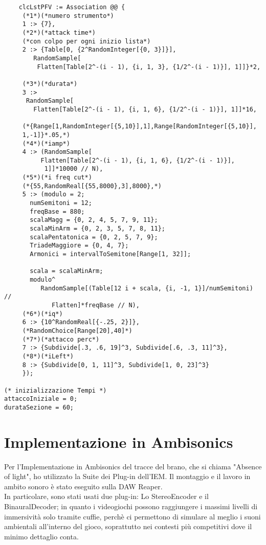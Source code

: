 \begin{lstlisting}
    clcLstPFV := Association @@ {
     (*1*)(*numero strumento*)
     1 :> {7},
     (*2*)(*attack time*)
     (*con colpo per ogni inizio lista*)
     2 :> {Table[0, {2^RandomInteger[{0, 3}]}], 
        RandomSample[
         Flatten[Table[2^-(i - 1), {i, 1, 3}, {1/2^-(i - 1)}], 1]]}*2,
     
     (*3*)(*durata*)
     3 :> 
      RandomSample[
        Flatten[Table[2^-(i - 1), {i, 1, 6}, {1/2^-(i - 1)}], 1]]*16,
     
     (*{Range[1,RandomInteger[{5,10}],1],Range[RandomInteger[{5,10}],
     1,-1]}*.05,*)
     (*4*)(*iamp*)
     4 :> (RandomSample[
          Flatten[Table[2^-(i - 1), {i, 1, 6}, {1/2^-(i - 1)}], 
           1]]*10000 // N),
     (*5*)(*i freq cut*)
     (*{55,RandomReal[{55,8000},3],8000},*)
     5 :> (modulo = 2;
       numSemitoni = 12;
       freqBase = 880;
       scalaMagg = {0, 2, 4, 5, 7, 9, 11};
       scalaMinArm = {0, 2, 3, 5, 7, 8, 11};
       scalaPentatonica = {0, 2, 5, 7, 9};
       TriadeMaggiore = {0, 4, 7};
       Armonici = intervalToSemitone[Range[1, 32]];
       
       scala = scalaMinArm;
       modulo^
          RandomSample[(Table[12 i + scala, {i, -1, 1}]/numSemitoni) //
             Flatten]*freqBase // N),
     (*6*)(*iq*)
     6 :> {10^RandomReal[{-.25, 2}]},
     (*RandomChoice[Range[20],40]*)
     (*7*)(*attacco perc*)
     7 :> {Subdivide[.3, .6, 19]^3, Subdivide[.6, .3, 11]^3},
     (*8*)(*iLeft*)
     8 :> {Subdivide[0, 1, 11]^3, Subdivide[1, 0, 23]^3}
     });

(* inizializzazione Tempi *)
attaccoIniziale = 0;
durataSezione = 60;
\end{lstlisting}

\section{Implementazione in Ambisonics}
Per l'Implementazione in Ambisonics del tracce del brano, che si chiama "Absence of light", ho utilizzato la Suite dei Plug-in dell'IEM.
Il montaggio e il lavoro in ambito sonoro è stato eseguito sulla DAW Reaper.\\
In particolare, sono stati usati due plug-in: Lo StereoEncoder e il BinauralDecoder; in quanto i videogiochi possono raggiungere i massimi
livelli di immersività solo tramite cuffie, perchè ci permettono di simulare al meglio i suoni ambientali all'interno del gioco, 
soprattutto nei contesti più competitivi dove il minimo dettaglio conta.

